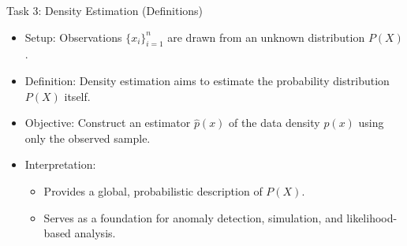 \documentclass[aspectratio=169]{beamer}
\newcommand{\1}{\mathbf{1}}
\begin{document}
\begin{frame}{Task 3: Density Estimation (Definitions)}
    \small
    \begin{itemize}
        \item Setup:
        Observations $\{x_i\}_{i=1}^n$ are drawn from an unknown distribution $P(X)$.
        
        \item Definition:
        Density estimation aims to estimate the probability distribution $P(X)$ itself.
        
        \item Objective:
        Construct an estimator $\hat{p}(x)$ of the data density $p(x)$
        using only the observed sample.
        
        \item Interpretation:
        \begin{itemize}
            \item Provides a global, probabilistic description of $P(X)$.
            \item Serves as a foundation for anomaly detection, simulation, and likelihood-based analysis.
        \end{itemize}
    \end{itemize}
\end{frame}
\end{document}
